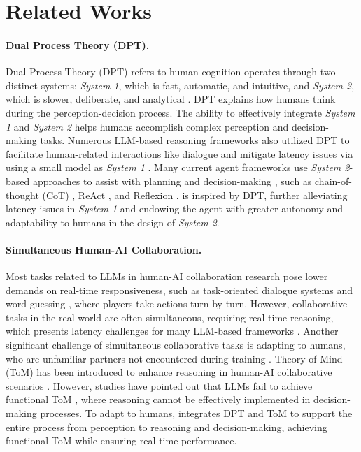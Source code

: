 \section{Related Works}
\paragraph{Dual Process Theory (DPT).}
Dual Process Theory (DPT) \cite{evans2013dual} refers to human cognition operates through two distinct systems: \textit{System 1}, which is fast, automatic, and intuitive, and \textit{System 2}, which is slower, deliberate, and analytical \cite{kahneman2011thinking}.
DPT explains how humans think during the perception-decision process. 
The ability to effectively integrate \textit{System 1} and \textit{System 2} helps humans accomplish complex perception and decision-making tasks.
Numerous LLM-based reasoning frameworks also utilized DPT to facilitate human-related interactions like dialogue \cite{he-etal-2024-planning} and mitigate latency issues via using a small model as \textit{System 1} \cite{liu2024slow}.
Many current agent frameworks use \textit{System 2}-based approaches to assist with planning and decision-making \cite{yu2024distilling,DBLP:conf/acl/ZhangTWW0HTLZ024}, such as chain-of-thought (CoT) \cite{wei2022chain}, ReAct \cite{yao2022react}, and Reflexion \cite{shinn2024reflexion}.
\framework is inspired by DPT, further alleviating latency issues in \textit{System 1} and endowing the agent with greater autonomy and adaptability to humans in the design of \textit{System 2}.


\paragraph{Simultaneous Human-AI Collaboration.}
Most tasks related to LLMs in human-AI collaboration research pose lower demands on real-time responsiveness, such as task-oriented dialogue systems \cite{yi2024survey} and word-guessing \cite{zahra2021direction}, where players take actions turn-by-turn.
However, collaborative tasks in the real world are often simultaneous, requiring real-time reasoning, which presents latency challenges for many LLM-based frameworks \cite{DBLP:conf/icra/LiangHXXHIFZ23}.
Another significant challenge of simultaneous collaborative tasks is adapting to humans, who are unfamiliar partners not encountered during training \cite{wang2024zsc,Yang23Cole,carroll2019utility,zhang2024proagent}. 
Theory of Mind (ToM) \cite{neil2018tom,baron1985does} has been introduced to enhance reasoning in human-AI collaborative scenarios \cite{wester2024theory}.
However, studies have pointed out that LLMs fail to achieve functional ToM \cite{riemer2024can}, where reasoning cannot be effectively implemented in decision-making processes.
To adapt to humans, \framework integrates DPT and ToM to support the entire process from perception to reasoning and decision-making, achieving functional ToM while ensuring real-time performance.
